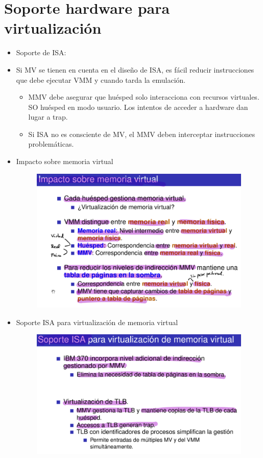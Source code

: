 \documentclass[12pt, twoside, openright]{report} %
\begin{document}
    
\section{Soporte hardware para virtualización}

  \begin{itemize}
  \item
    Soporte de ISA:
  \item
    Si MV se tienen en cuenta en el diseño de ISA, es fácil reducir
    instrucciones que debe ejecutar VMM y cuando tarda la emulación.

    \begin{itemize}
    
    \item
      MMV debe asegurar que huésped solo interacciona con recursos
      virtuales. SO huésped en modo usuario. Los intentos de acceder a
      hardware dan lugar a trap.
    \item
      Si ISA no es consciente de MV, el MMV deben interceptar
      instrucciones problemáticas.
    \end{itemize}
  \item
    Impacto sobre memoria virtual
    \begin{figure}[H]
      {\includegraphics[scale=.3]{Untitled 36.png}}
    \end{figure}
  \item
    Soporte ISA para virtualización de memoria virtual
    \begin{figure}[H]
      {\includegraphics[scale=.4]{Untitled 37.png}}

\end{figure}
\end{itemize}
\end{document}
